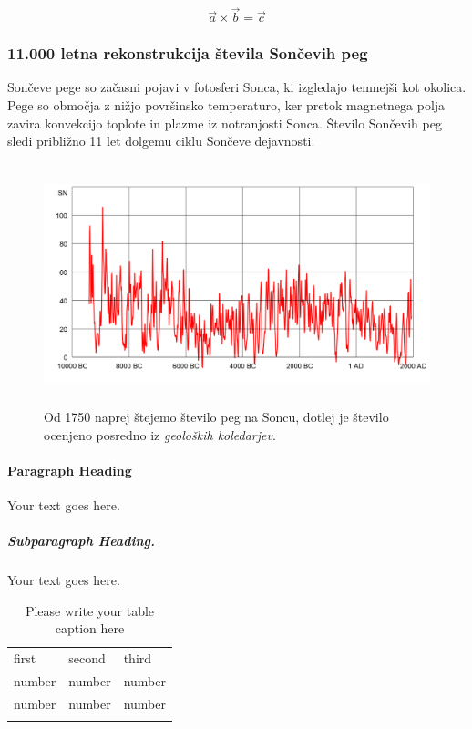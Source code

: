 \begin{equation}
\vec{a}\times\vec{b}=\vec{c}
\end{equation}

\subsubsection{11.000 letna rekonstrukcija števila Sončevih peg}

Sončeve pege so začasni pojavi v fotosferi Sonca, ki izgledajo temnejši kot okolica. Pege so območja z nižjo površinsko temperaturo, ker pretok magnetnega polja zavira konvekcijo toplote in plazme iz notranjosti Sonca. Število Sončevih peg sledi približno 11 let dolgemu ciklu Sončeve dejavnosti.

\begin{figure}
	\centering
	\includegraphics[height=7cm]{Predavanja/05_SatLastPolozaj/figs/Sunspots_11000_years.png}
	\caption{Od 1750 naprej štejemo število peg na Soncu, dotlej je število ocenjeno posredno iz \textit{geoloških koledarjev}.}
	\label{fig:Gnss_Polozaj:11tisocLetSN}
\end{figure}



\paragraph{Paragraph Heading} %
Your text goes here.

\subparagraph{Subparagraph Heading.} Your text goes here.%
%
%
%
\begin{table}
\centering
\caption{Please write your table caption here}
\label{tab:1}       %
%
%
\begin{tabular}{lll}
\hline\noalign{\smallskip}
first & second & third  \\
\noalign{\smallskip}\hline\noalign{\smallskip}
number & number & number \\
number & number & number \\
\noalign{\smallskip}\hline
\end{tabular}
\end{table}
%
%
%

